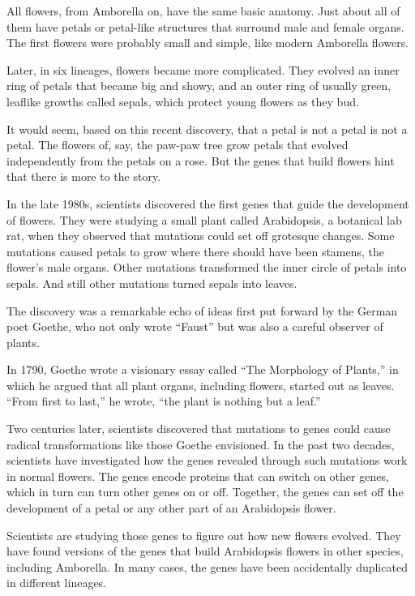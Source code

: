 ﻿\documentclass[12pt]{article}
\begin{document}
All flowers, from Amborella on, have the same basic anatomy. Just about all of them have petals or
petal-like structures that surround male and female organs. The first flowers were probably small
and simple, like modern Amborella flowers.

Later, in six lineages, flowers became more complicated. They evolved an inner ring of petals that
became big and showy, and an outer ring of usually green, leaflike growths called sepals, which
protect young flowers as they bud.

It would seem, based on this recent discovery, that a petal is not a petal is not a petal. The
flowers of, say, the paw-paw tree grow petals that evolved independently from the petals on a rose.
But the genes that build flowers hint that there is more to the story.

In the late 1980s, scientists discovered the first genes that guide the development of flowers. They
were studying a small plant called Arabidopsis, a botanical lab rat, when they observed that
mutations\cite{mutation} could set off grotesque changes. Some mutations caused petals to grow where
there should have been stamens, the flower's male organs. Other mutations transformed the inner
circle of petals into sepals. And still other mutations turned sepals into leaves.

The discovery was a remarkable echo of ideas first put forward by the German poet Goethe, who not
only wrote ``Faust'' but was also a careful observer of plants.

In 1790, Goethe wrote a visionary essay called ``The Morphology\cite{morphology} of Plants,'' in
which he argued that all plant organs, including flowers, started out as leaves. ``From first to
last,'' he wrote, ``the plant is nothing but a leaf.''

Two centuries later, scientists discovered that mutations to genes could cause radical
transformations like those Goethe envisioned. In the past two decades, scientists have investigated
how the genes revealed through such mutations work in normal flowers. The genes encode proteins that
can switch on other genes, which in turn can turn other genes on or off. Together, the genes can set
off the development of a petal or any other part of an Arabidopsis flower.

Scientists are studying those genes to figure out how new flowers evolved. They have found versions
of the genes that build Arabidopsis flowers in other species, including Amborella. In many cases,
the genes have been accidentally duplicated in different lineages.
\end{document}
